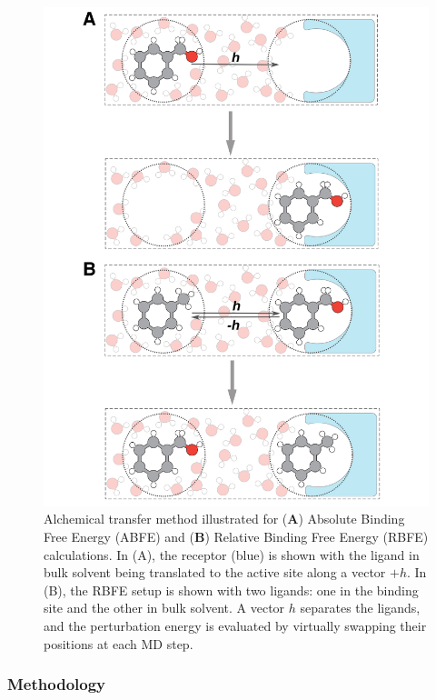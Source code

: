 \documentclass[9pt,bestpractices]{livecoms}
\begin{document}
\begin{figure}[h!]
    \centering
    \includegraphics[width=0.95\linewidth]
    {paper/figures_atm/atm_scheme_abfe_rbfe.pdf}
    \caption{\small Alchemical transfer method illustrated for (\textbf{A}) Absolute Binding Free Energy (ABFE) and (\textbf{B}) Relative Binding Free Energy (RBFE) calculations. In (A), the receptor (blue) is shown with the ligand in bulk solvent being translated to the active site along a vector $+h$. In (B), the RBFE setup is shown with two ligands: one in the binding site and the other in bulk solvent. A vector $h$ separates the ligands, and the perturbation energy is evaluated by virtually swapping their positions at each MD step.}
    \label{fig:atm-illustration}
\end{figure}

\subsubsection{Methodology}
\end{document}
